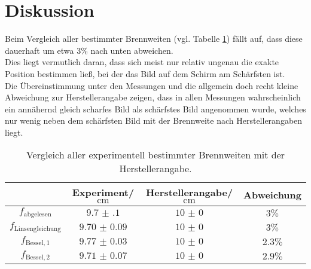 \FloatBarrier
\section{Diskussion}
\label{sec:Diskussion}
Beim Vergleich aller bestimmter Brennweiten (vgl. Tabelle \ref{tab:diskus}) fällt auf, dass diese dauerhaft um etwa $3\%$ nach unten abweichen.
\\Dies liegt vermutlich daran, dass sich meist nur relativ ungenau die exakte Position bestimmen ließ, bei der das Bild auf dem Schirm am Schärfsten ist.
\\Die Übereinstimmung unter den Messungen und die allgemein doch recht kleine Abweichung zur Herstellerangabe zeigen, dass in allen Messungen wahrscheinlich ein annähernd gleich scharfes Bild als schärfstes Bild angenommen wurde, welches nur wenig neben dem schärfsten Bild mit der Brennweite nach Herstellerangaben liegt.

\begin{table}
  \centering
  \caption{Vergleich aller experimentell bestimmter Brennweiten mit der Herstellerangabe.}
  \label{tab:diskus}
  \begin{tabular}{cccc}
    \toprule
    &Experiment/$\si{\centi\meter}$&Herstellerangabe/$\si{\centi\meter}$&Abweichung\\
    \midrule
    $f_{\mathrm{abgelesen}}$&$\num{9.7(1)}$&$\num{10(0)}$&$3\%$\\
    $f_{\mathrm{Linsengleichung}}$&$\num{9.70(9)}$&$\num{10(0)}$&$3\%$\\
    $f_\mathrm{Bessel, 1}$&$\num{9.77(3)}$&$\num{10(0)}$&$2.3\%$\\
    $f_\mathrm{Bessel, 2}$&$\num{9.71(7)}$&$\num{10(0)}$&$2.9\%$\\
\bottomrule
\end{tabular}
\end{table}


